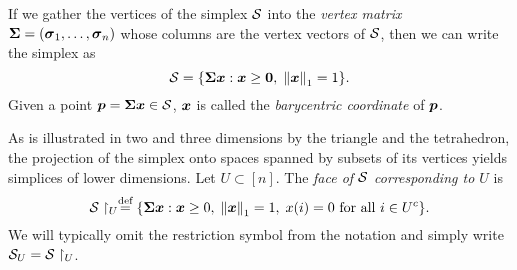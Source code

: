 If we gather the vertices of the simplex $\mathcal{S}$ into the \emph{vertex matrix} $\boldsymbol{\Sigma}=(\vb*{\sigma}_1,\dots,\vb*{\sigma}_n)$ whose columns are the vertex vectors of $\mathcal{S}$, then we can write the simplex as 
\begin{equation*}
    \mathcal{S} = \{\boldsymbol{\Sigma} \vb*{x}:\vb*{x}\geq \vb{0}, \; \norm{\vb*{x}}_1=1\}.
\end{equation*}
Given a point $\vb*{p}=\boldsymbol{\Sigma}\vb*{x}\in\mathcal{S}$, $\vb*{x}$ is called the \emph{barycentric coordinate} of $\vb*{p}$.  

As is illustrated in two and three dimensions by the triangle and the tetrahedron, the projection of the simplex onto spaces spanned by subsets of its vertices yields simplices of lower dimensions. Let $U\subset [n]$. The \emph{face of $\mathcal{S}$ corresponding to $U$} is 
\begin{equation*}
    \mathcal{S}\restriction_U \overset{\text{def}}{=} \{\boldsymbol{\Sigma}\vb*{x}: \vb*{x}\geq 0,\;\norm{\vb*{x}}_1=1,\;x(i)=0\text{ for all }i\in U^c\}.
\end{equation*}
We will typically omit the restriction symbol from the notation and simply write $\mathcal{S}_U=\mathcal{S}\restriction_U$. 





